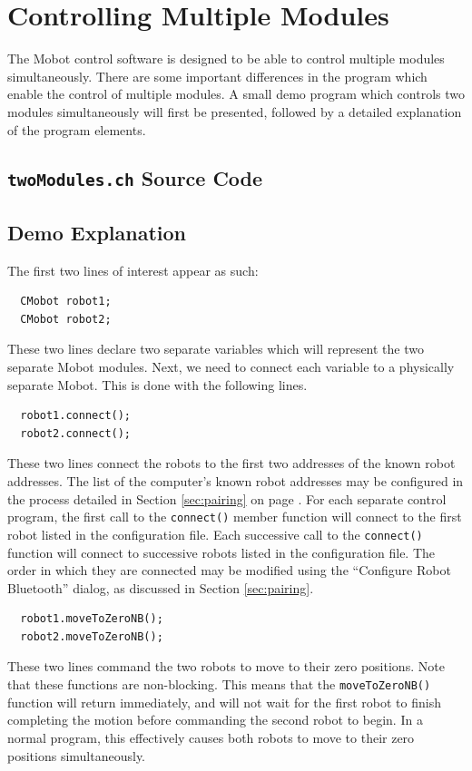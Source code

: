 \documentclass{article}
\begin{document}
\section{Controlling Multiple Modules}
The Mobot control software is designed to be able to control multiple modules
simultaneously. There are some important differences in the program 
which enable the control of multiple modules. A small demo program which
controls two modules simultaneously will first be presented, followed by
a detailed explanation of the program elements.

\subsection{\texttt{twoModules.ch} Source Code}


\subsection{Demo Explanation}
The first two lines of interest appear as such:
\begin{verbatim}
  CMobot robot1;
  CMobot robot2;
\end{verbatim}
These two lines declare two separate variables which will represent the
two separate Mobot modules. Next, we need to connect each variable to
a physically separate Mobot. This is done with the following lines.
\begin{verbatim}
  robot1.connect();
  robot2.connect();
\end{verbatim}
These two lines connect the robots to the first two addresses
of the known robot addresses. The list of the computer's known
robot addresses may be configured in the process detailed in Section
\ref{sec:pairing} on page \pageref{sec:pairing}. For each separate
control program, the first call to the \texttt{connect()} member
function will connect to the first robot listed in the configuration
file. Each successive call to the \texttt{connect()} function will
connect to successive robots listed in the configuration file. 
The order in which they are connected may be modified using the
``Configure Robot Bluetooth'' dialog, as discussed in Section
\ref{sec:pairing}.

\begin{verbatim}
  robot1.moveToZeroNB();
  robot2.moveToZeroNB();
\end{verbatim}
These two lines command the two robots to move to their zero positions.
Note that these functions are non-blocking. This means that the
\texttt{moveToZeroNB()} function will return immediately, and will not
wait for the first robot to finish completing the motion before 
commanding the second robot to begin. In a normal program, this effectively
causes both robots to move to their zero positions simultaneously.
\end{document}
